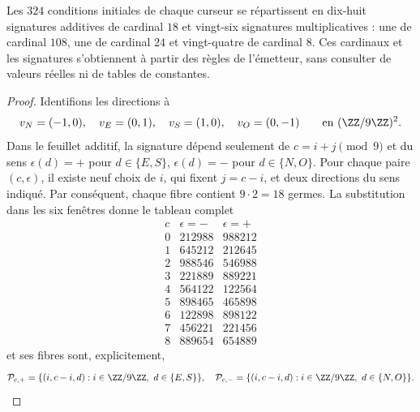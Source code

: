 \begin{lemma}
\label{lem:censo-interno-firmas}
Les \(324\) conditions initiales de chaque curseur se répartissent en dix-huit
signatures additives de cardinal \(18\) et vingt-six signatures multiplicatives : une
de cardinal \(108\), une de cardinal \(24\) et vingt-quatre de cardinal \(8\).
Ces cardinaux et les signatures s’obtiennent à partir des règles de l’émetteur, sans
consulter de valeurs réelles ni de tables de constantes.
\end{lemma}
\begin{proof}
Identifions les directions à
\[
 v_N=(-1,0),\quad v_E=(0,1),\quad
 v_S=(1,0),\quad v_O=(0,-1)
 \qquad\text{en }(\ZZ/9\ZZ)^2.
\]
Dans le feuillet additif, la signature dépend seulement de \(c=i+j\pmod9\) et du sens \(\epsilon(d)=+\) pour \(d\in\{E,S\}\), \(\epsilon(d)=-\) pour \(d\in\{N,O\}\). Pour chaque paire \((c,\epsilon)\), il existe neuf choix de \(i\), qui fixent \(j=c-i\), et deux directions du sens indiqué. Par conséquent, chaque fibre contient \(9\cdot2=18\) germes. La substitution dans les six fenêtres donne le tableau complet
\[
\begin{array}{c|cc}
c&\epsilon=-&\epsilon=+\\ \hline
0&212988&988212\\
1&645212&212645\\
2&988546&546988\\
3&221889&889221\\
4&564122&122564\\
5&898465&465898\\
6&122898&898122\\
7&456221&221456\\
8&889654&654889
\end{array}
\tag{A}
\label{eq:tabla-firmas-aditivas}
\]
et ses fibres sont, explicitement,
\[
 \mathcal P_{c,+}=\{(i,c-i,d):i\in\ZZ/9\ZZ,\ d\in\{E,S\}\},
 \quad
 \mathcal P_{c,-}=\{(i,c-i,d):i\in\ZZ/9\ZZ,\ d\in\{N,O\}\}.
\]


\end{proof}

